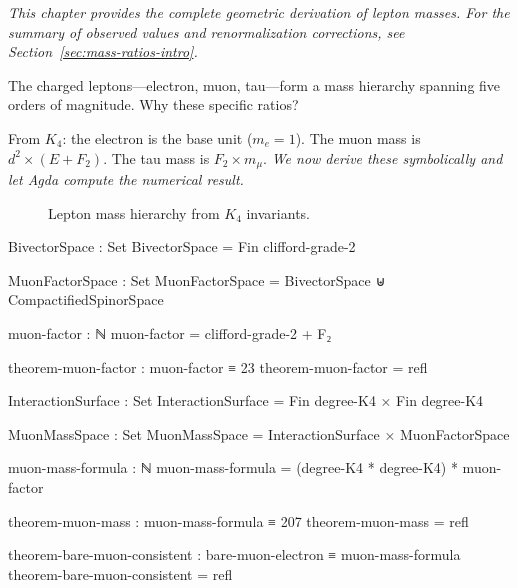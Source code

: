 \documentclass[11pt,a4paper]{book}
\def\cdot{.}%
\begin{document}
\noindent\textit{This chapter provides the complete geometric derivation of lepton masses. For the summary of observed values and renormalization corrections, see Section~\ref{sec:mass-ratios-intro}.}

\medskip
The charged leptons---electron, muon, tau---form a mass hierarchy spanning five orders of magnitude. Why these specific ratios?

From $K_4$: the electron is the base unit ($m_e = 1$). The muon mass is $d^2 \times (E + F_2)$. The tau mass is $F_2 \times m_\mu$. \emph{We now derive these symbolically and let Agda compute the numerical result.}

\begin{figure}[h]
\centering
{}
\caption{Lepton mass hierarchy from $K_4$ invariants.}
\label{fig:lepton-masses}
\end{figure}

\begin{code}
BivectorSpace : Set
BivectorSpace = Fin clifford-grade-2

MuonFactorSpace : Set
MuonFactorSpace = BivectorSpace ⊎ CompactifiedSpinorSpace

muon-factor : ℕ
muon-factor = clifford-grade-2 + F₂

theorem-muon-factor : muon-factor ≡ 23
theorem-muon-factor = refl
\end{code}

\begin{code}
InteractionSurface : Set
InteractionSurface = Fin degree-K4 × Fin degree-K4

MuonMassSpace : Set
MuonMassSpace = InteractionSurface × MuonFactorSpace

muon-mass-formula : ℕ
muon-mass-formula = (degree-K4 * degree-K4) * muon-factor

theorem-muon-mass : muon-mass-formula ≡ 207
theorem-muon-mass = refl

theorem-bare-muon-consistent : bare-muon-electron ≡ muon-mass-formula
theorem-bare-muon-consistent = refl
\end{code}
\end{document}
